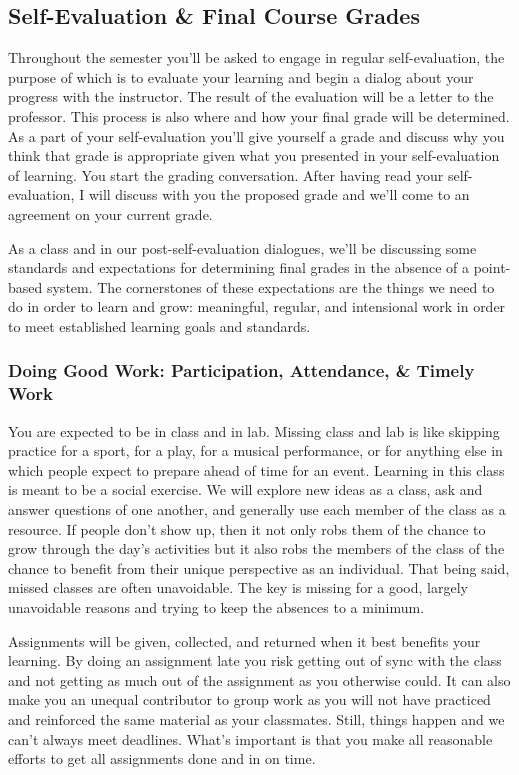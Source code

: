 \documentclass[10pt]{article}
\begin{document}
\subsection{Self-Evaluation \& Final Course Grades}

Throughout the semester you'll be asked to engage in regular self-evaluation, the purpose of which is to evaluate your learning and begin a dialog about your progress with the instructor. The result of the evaluation will be a letter to the professor. This process is also where and how your final grade will be determined. As a part of your self-evaluation you'll give yourself a grade and discuss why you think that grade is appropriate given what you presented in your self-evaluation of learning. You start the grading conversation. After having read your self-evaluation, I will discuss with you the proposed grade and we'll come to an agreement on your current grade.

As a class and in our post-self-evaluation dialogues, we'll be discussing some standards and expectations for determining final grades in the absence of a point-based system. The cornerstones of these expectations are the things we need to do in order to learn and grow: meaningful, regular, and intensional work in order to meet established learning goals and standards.


\subsubsection{Doing Good Work: Participation, Attendance, \& Timely Work}

You are expected to be in class and in lab. Missing class and lab is like skipping practice for a sport, for a play, for a musical performance, or for anything else in which people expect to prepare ahead of time for an event. Learning in this class is meant to be a social exercise. We will explore new ideas as a class, ask and answer questions of one another, and generally use each member of the class as a resource. If people don't show up, then it not only robs them of the chance to grow through the day's activities but it also robs the members of the class of the chance to benefit from their unique perspective as an individual. That being said, missed classes are often unavoidable. The key is missing for a good, largely unavoidable reasons and trying to keep the absences to a minimum.

Assignments will be given, collected, and returned when it best benefits your learning. By doing an assignment late you risk getting out of sync with the class and not getting as much out of the assignment as you otherwise could. It can also make you an unequal contributor to group work as you will not have practiced and reinforced the same material as your classmates. Still, things happen and we can't always meet deadlines.  What's important is that you make all reasonable efforts to get all assignments done and in on time.
\end{document}
